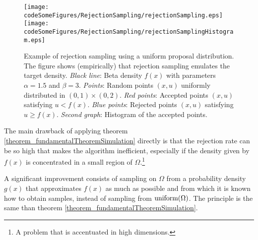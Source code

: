 \begin{figure}[!htbp]
  \centering
    \texttt{[image: codeSomeFigures/RejectionSampling/rejectionSampling.eps]}
    \texttt{[image: codeSomeFigures/RejectionSampling/rejectionSamplingHistogram.eps]}
  \caption[Example of rejection sampling using a uniform proposal distribution.]%
{Example of rejection sampling using a uniform proposal distribution. The figure shows (empirically) that rejection sampling emulates the target density.
  \emph{Black line}: Beta density $f(x)$ with parameters $\alpha = 1.5$ and $\beta = 3$. 
  \emph{Points}: Random points $(x,u)$ uniformly distributed in $(0,1)\times(0,2)$. 
  \emph{Red points}: Accepted points $(x,u)$ satisfying $u < f(x)$. 
  \emph{Blue points}: Rejected points $(x,u)$ satisfying $u \geq f(x)$. 
  \emph{Second graph}: Histogram of the accepted points. 
}
  \label{fig_RejectionSampling}
\end{figure}


The main drawback of applying theorem \ref{theorem_fundamentalTheoremSimulation} directly is that the rejection rate can be so high that makes the algorithm inefficient, especially if the density given by $f(x)$ is concentrated in a small region of $\Omega$.\footnote{A problem that is accentuated in high dimensions.} 

A significant improvement consists of sampling on $\Omega$ from a probability density $g(x)$ that approximates $f(x)$ as much as possible and from which it is known how to obtain samples, instead of sampling from $\textup{uniform}(\Omega)$. The principle is the same than theorem \ref{theorem_fundamentalTheoremSimulation}. 

